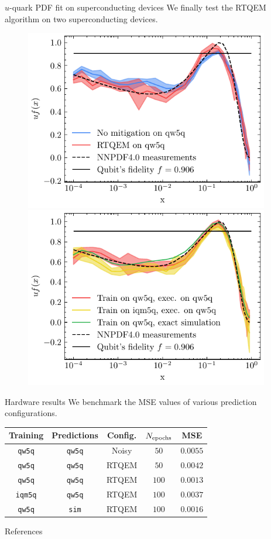 \documentclass[20pt, final]{beamer}
\newlength{\sepwidth}
\newlength{\colwidth}
\newcommand{\separatorcolumn}{\begin{column}{\sepwidth}\end{column}}
\begin{document}
\begin{frame}[t]
\begin{columns}[t]
\begin{column}{\colwidth}
\begin{block}{$u$-quark PDF fit on superconducting devices}
We finally test the RTQEM algorithm on two superconducting devices.
\begin{figure}
  \centering
    \includegraphics[width=0.5\linewidth]{figures/qw5q_short.pdf}%
    \includegraphics[width=0.5\linewidth]{figures/benchs.pdf}%
    \label{fig:hdw}
  \end{figure}
\end{block}

\begin{alertblock}{Hardware results}
We benchmark the MSE values of various prediction configurations.
\begin{center}
\begin{tabular}{ccccc}
\hline \hline 
\textbf{Training} & \textbf{Predictions} &  \textbf{Config.} & $N_{\rm epochs}$ & MSE \\
\hline
\texttt{qw5q} & \texttt{qw5q} & Noisy & $50$ & $0.0055$   \\     
\texttt{qw5q} & \texttt{qw5q} & RTQEM & $50$ & $0.0042$   \\     
\texttt{qw5q} & \texttt{qw5q} & RTQEM & $100$ & $0.0013$  \\     
\texttt{iqm5q} & \texttt{qw5q} & RTQEM & $100$ & $0.0037$ \\   
\texttt{qw5q} & \texttt{sim} & RTQEM & $100$ & $0.0016$ \\   
\hline \hline
\end{tabular}
\end{center}
\end{alertblock}



\vspace{-1cm}
\begin{block}{References}
  \nocite{*}
    \small  {}
  \end{block}
\end{column}

\separatorcolumn
\end{columns}
\end{frame}
\end{document}
